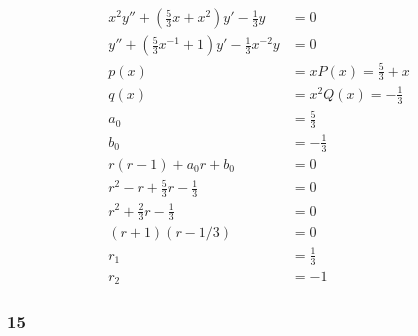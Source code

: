 \documentclass{article}
\begin{document}
\begin{align*}
  x^2 y'' + \left( \frac{5}{3} x + x^2 \right) y' - \frac{1}{3} y       & = 0                        \\
  y'' + \left( \frac{5}{3} x^{-1} + 1 \right) y' - \frac{1}{3} x^{-2} y & = 0                        \\
  p(x)                                                                  & = x P(x) = \frac{5}{3} + x \\
  q(x)                                                                  & = x^2 Q(x) = -\frac{1}{3}  \\
  a_0                                                                   & = \frac{5}{3}              \\
  b_0                                                                   & = -\frac{1}{3}             \\
  r (r - 1) + a_0 r + b_0                                               & = 0                        \\
  r^2 - r + \frac{5}{3} r - \frac{1}{3}                                 & = 0                        \\
  r^2 + \frac{2}{3} r - \frac{1}{3}                                     & = 0                        \\
  (r + 1) (r - 1 / 3)                                                   & = 0                        \\
  r_1                                                                   & = \frac{1}{3}              \\
  r_2                                                                   & = -1
\end{align*}

\subsubsection{15}
\end{document}
